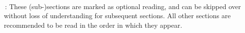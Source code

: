 \tableofcontents

\noindent\\
\optional\,:
These (sub-)sections are marked as optional reading, and can be skipped over without loss of understanding for subsequent sections.
All other sections are recommended to be read in the order in which they appear.
